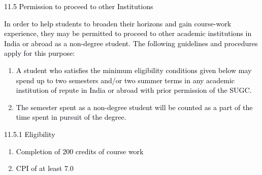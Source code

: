 \documentclass[12pt]{article}
\begin{document}
\vspace{\baselineskip}
\textcolor[HTML]{00000A}{11.5 Permission to proceed to other Institutions}\par


\vspace{\baselineskip}
\begin{justify}
{\fontsize{10pt}{12.0pt}\selectfont \textcolor[HTML]{00000A}{In order to help students to broaden their horizons and gain course-work experience, they may be permitted to proceed to other academic institutions in India or abroad as a non-degree student. The following guidelines and procedures apply for this purpose:}\par}
\end{justify}\par


\vspace{\baselineskip}
\begin{enumerate}
	\item {\fontsize{10pt}{12.0pt}\selectfont \textcolor[HTML]{00000A}{A student who satisfies the minimum eligibility conditions given below may spend up to two semesters and/or two summer terms in any academic institution of repute in India or abroad with prior permission of the SUGC.}\par}\par


\vspace{\baselineskip}
	\item {\fontsize{9pt}{10.8pt}\selectfont \textcolor[HTML]{00000A}{The semester spent as a non-degree student will be counted as a part of the time spent in pursuit of the degree.}\par}
\end{enumerate}\par


\vspace{\baselineskip}
{\fontsize{10pt}{12.0pt}\selectfont \textcolor[HTML]{00000A}{11.5.1 Eligibility}\par}\par


\vspace{\baselineskip}
\begin{enumerate}
	\item {\fontsize{10pt}{12.0pt}\selectfont \textcolor[HTML]{00000A}{Completion of 200 credits of course work}\par}\par


\vspace{\baselineskip}
	\item {\fontsize{10pt}{12.0pt}\selectfont \textcolor[HTML]{00000A}{CPI of at least 7.0}\par}
\end{enumerate}\par
\end{document}
